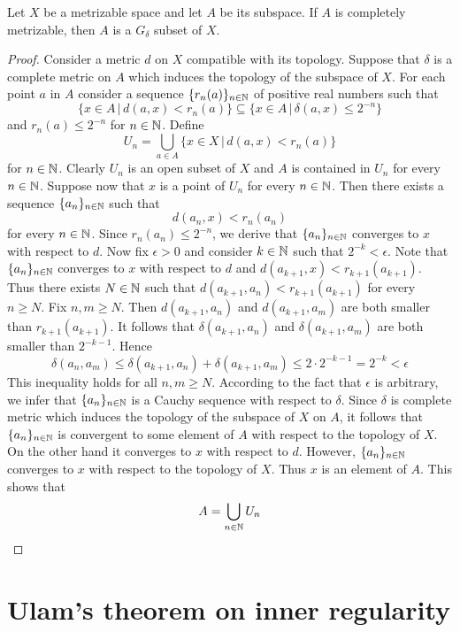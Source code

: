 \begin{theorem}\label{theorem:completely_metrizable_subspace_of_metrizable_space_is_G_delta}
Let $X$ be a metrizable space and let $A$ be its subspace. If $A$ is completely metrizable, then $A$ is a $G_{\delta}$ subset of $X$.
\end{theorem}
\begin{proof}
Consider a metric $d$ on $X$ compatible with its topology. Suppose that $\delta$ is a complete metric on $A$ which induces the topology of the subspace of $X$. For each point $a$ in $A$ consider a sequence $\{r_n(a)\}_{n\in {\mathbb N}}$ of positive real numbers such that
$$\big\{x\in A\,\big|\,d(a,x) < r_n(a)\big\} \subseteq \big\{x\in A\,\big|\,\delta(a,x)\leq 2^{-n}\big\}$$
and $r_n(a) \leq 2^{-n}$ for $n\in {\mathbb N}$. Define
$$U_n = \bigcup_{a\in A}\big\{x\in X\,\big|\,d(a,x) < r_n(a)\big\}$$
for $n\in {\mathbb N}$. Clearly $U_n$ is an open subset of $X$ and $A$ is contained in $U_n$ for every $n\in {\mathbb N}$. Suppose now that $x$ is a point of $U_n$ for every $n\in {\mathbb N}$. Then there exists a sequence $\{a_n\}_{n\in {\mathbb N}}$ such that
$$d(a_n,x) < r_n(a_n)$$
for every $n\in {\mathbb N}$. Since $r_{n}(a_n) \leq 2^{-n}$, we derive that $\{a_n\}_{n\in {\mathbb N}}$ converges to $x$ with respect to $d$. Now fix $\epsilon > 0$ and consider $k\in {\mathbb N}$ such that $2^{-k} < \epsilon$. Note that $\{a_n\}_{n\in {\mathbb N}}$ converges to $x$ with respect to $d$ and $d(a_{k+1},x) < r_{k+1}(a_{k+1})$. Thus there exists $N\in {\mathbb N}$ such that $d(a_{k+1},a_n) < r_{k+1}(a_{k+1})$ for every $n\geq N$. Fix $n,m\geq N$. Then $d(a_{k+1},a_n)$ and $d(a_{k+1},a_m)$ are both smaller than $r_{k+1}(a_{k+1})$. It follows that $\delta(a_{k+1},a_n)$ and $\delta(a_{k+1},a_m)$ are both smaller than $2^{-k-1}$. Hence
$$\delta(a_n,a_m) \leq \delta(a_{k+1},a_n) + \delta(a_{k+1},a_m) \leq 2 \cdot 2^{-k-1} = 2^{-k} < \epsilon$$
This inequality holds for all $n,m\geq N$. According to the fact that $\epsilon$ is arbitrary, we infer that $\{a_n\}_{n\in {\mathbb N}}$ is a Cauchy sequence with respect to $\delta$. Since $\delta$ is complete metric which induces the topology of the subspace of $X$ on $A$, it follows that $\{a_n\}_{n\in {\mathbb N}}$ is convergent to some element of $A$ with respect to the topology of $X$. On the other hand it converges to $x$ with respect to $d$. However, $\{a_n\}_{n\in {\mathbb N}}$ converges to $x$ with respect to the topology of $X$. Thus $x$ is an element of $A$. This shows that
$$A = \bigcup_{n\in {\mathbb N}}U_n$$
\end{proof}

\section{Ulam's theorem on inner regularity}

